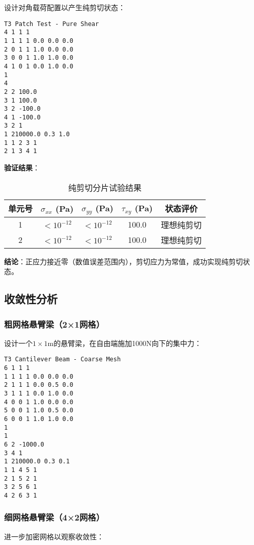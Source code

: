 \documentclass[12pt,a4paper]{article}
\begin{document}
设计对角载荷配置以产生纯剪切状态：

\begin{lstlisting}[caption=纯剪切分片试验输入文件]
T3 Patch Test - Pure Shear
4 1 1 1
1 1 1 1 0.0 0.0 0.0
2 0 1 1 1.0 0.0 0.0
3 0 0 1 1.0 1.0 0.0
4 1 0 1 0.0 1.0 0.0
1
4
2 2 100.0
3 1 100.0
3 2 -100.0
4 1 -100.0
3 2 1
1 210000.0 0.3 1.0
1 1 2 3 1
2 1 3 4 1
\end{lstlisting}

\textbf{验证结果}：

\begin{table}[H]
\centering
\caption{纯剪切分片试验结果}
\begin{tabular}{ccccc}
\toprule
单元号 & $\sigma_{xx}$ (Pa) & $\sigma_{yy}$ (Pa) & $\tau_{xy}$ (Pa) & 状态评价 \\
\midrule
1 & $<10^{-12}$ & $<10^{-12}$ & 100.0 & 理想纯剪切 \\
2 & $<10^{-12}$ & $<10^{-12}$ & 100.0 & 理想纯剪切 \\
\bottomrule
\end{tabular}
\end{table}

\textbf{结论}：正应力接近零（数值误差范围内），剪切应力为常值，成功实现纯剪切状态。

\subsection{收敛性分析}

\subsubsection{粗网格悬臂梁（2×1网格）}

设计一个$1\times 1$m的悬臂梁，在自由端施加1000N向下的集中力：

\begin{lstlisting}[caption=粗网格悬臂梁输入文件]
T3 Cantilever Beam - Coarse Mesh
6 1 1 1
1 1 1 1 0.0 0.0 0.0
2 1 1 1 0.0 0.5 0.0
3 1 1 1 0.0 1.0 0.0
4 0 0 1 1.0 0.0 0.0
5 0 0 1 1.0 0.5 0.0
6 0 0 1 1.0 1.0 0.0
1
1
6 2 -1000.0
3 4 1
1 210000.0 0.3 0.1
1 1 4 5 1
2 1 5 2 1
3 2 5 6 1
4 2 6 3 1
\end{lstlisting}

\subsubsection{细网格悬臂梁（4×2网格）}

进一步加密网格以观察收敛性：
\end{document}
